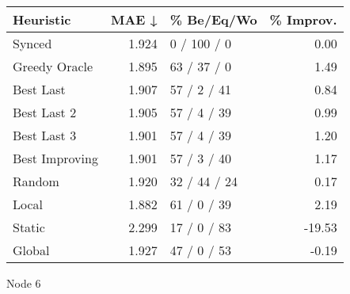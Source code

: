 \begin{tabular}{lrlr}
\toprule
\textbf{Heuristic} & \textbf{MAE ↓} & \textbf{\% Be/Eq/Wo} & \textbf{\% Improv.} \\
\midrule
            Synced &          1.924 &          0 / 100 / 0 &                0.00 \\
     Greedy Oracle &          1.895 &          63 / 37 / 0 &                1.49 \\
         Best Last &          1.907 &          57 / 2 / 41 &                0.84 \\
       Best Last 2 &          1.905 &          57 / 4 / 39 &                0.99 \\
       Best Last 3 &          1.901 &          57 / 4 / 39 &                1.20 \\
    Best Improving &          1.901 &          57 / 3 / 40 &                1.17 \\
            Random &          1.920 &         32 / 44 / 24 &                0.17 \\
             Local &          1.882 &          61 / 0 / 39 &                2.19 \\
            Static &          2.299 &          17 / 0 / 83 &              -19.53 \\
            Global &          1.927 &          47 / 0 / 53 &               -0.19 \\
\bottomrule
\end{tabular}
\caption{Node 6}
\label{tab:ds_non_lr01_le1_bs2_6}
